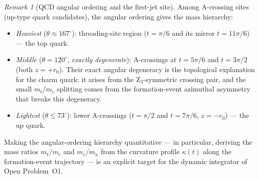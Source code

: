 \documentclass[11pt,a4paper]{article}
\theoremstyle{definition}\newtheorem{definition}[theorem]{Definition}
\theoremstyle{remark}
\newtheorem{remark}[theorem]{Remark}
\begin{document}
\begin{remark}[QCD angular ordering and the first-jet site]
Among A-crossing sites (up-type quark candidates), the angular
ordering gives the mass hierarchy:
\begin{itemize}[noitemsep]
\item \emph{Heaviest} ($\theta\approx167^\circ$): threading-site region
  ($t=\pi/6$ and its mirror $t=11\pi/6$) --- the top quark.
\item \emph{Middle} ($\theta=120^\circ$, \emph{exactly degenerate}):
  A-crossings at $t=5\pi/6$ and $t=3\pi/2$ (both $z=+r_0$).
  Their exact angular degeneracy is the topological explanation for
  the charm quark: it arises from the Z$_3$-symmetric crossing pair,
  and the small $m_t/m_c$ splitting comes from the formation-event
  azimuthal asymmetry that breaks this degeneracy.
\item \emph{Lightest} ($\theta\leq73^\circ$): lower A-crossings
  ($t=\pi/2$ and $t=7\pi/6$, $z=-r_0$) --- the up quark.
\end{itemize}
Making the angular-ordering hierarchy quantitative --- in particular,
deriving the mass ratios $m_t/m_c$ and $m_c/m_u$ from the curvature
profile $\kappa(t)$ along the formation-event trajectory --- is
an explicit target for the dynamic integrator of Open Problem~O1.
\end{remark}
\end{document}
